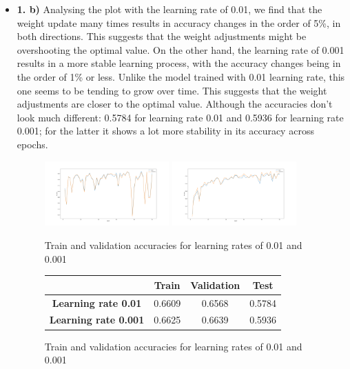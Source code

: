\documentclass[12pt]{article}
\begin{document}
\begin{itemize}
    \item \textbf{1. b)} Analysing the plot with the learning rate of 0.01, we find that the weight update many times results in accuracy changes in the order of 5\%, in both directions. This suggests that the weight adjustments might be overshooting the optimal value. On the other hand, the learning rate of 0.001 results in a more stable learning process, with the accuracy changes being in the order of 1\% or less. Unlike the model trained with 0.01 learning rate, this one seems to be tending to grow over time. This suggests that the weight adjustments are closer to the optimal value. Although the accuracies don't look much different: 0.5784 for learning rate 0.01 and 0.5936 for learning rate 0.001; for the latter it shows a lot more stability in its accuracy across epochs.
    \begin{figure}[h]
        \centering
        \includegraphics[width=0.45\textwidth]{../hw1-q1-1b.01.png}
        \includegraphics[width=0.45\textwidth]{../hw1-q1-1b.001.png}
        \caption{Train and validation accuracies for learning rates of 0.01 and 0.001}
        \label{fig:1b}
    \end{figure}
    \begin{figure}[h]
        \centering
        \begin{tabular}{|c|c|c|c|}
            \toprule
            & \textbf{Train} & \textbf{Validation} & \textbf{Test} \\
            \midrule
            \textbf{Learning rate 0.01} & 0.6609 & 0.6568 & 0.5784 \\
            \textbf{Learning rate 0.001} & 0.6625 & 0.6639 & 0.5936 \\
            \bottomrule
        \end{tabular}
        \label{tab:1b}
        \caption{Train and validation accuracies for learning rates of 0.01 and 0.001}

\end{figure}
\end{itemize}
\end{document}
